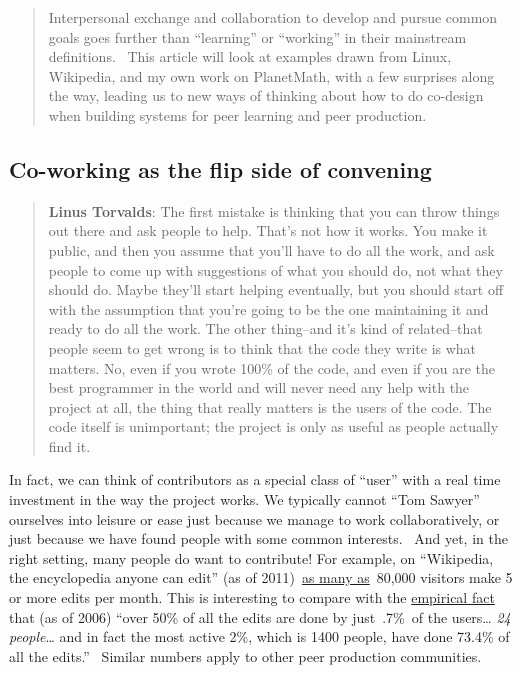 \begin{quote}
Interpersonal exchange and collaboration to develop and pursue common
goals goes further than ``learning'' or ``working'' in their mainstream
definitions. ~This article will look at examples drawn from Linux,
Wikipedia, and my own work on PlanetMath, with a few surprises along the
way, leading us to new ways of thinking about how to do co-design when
building systems for peer learning and peer production.
\end{quote}

\hypertarget{co-working-as-the-flip-side-of-convening}{%
\subsection{Co-working as the flip side of
convening}\label{co-working-as-the-flip-side-of-convening}}

\begin{quote}
\textbf{Linus Torvalds}: The first mistake is thinking that you can
throw things out there and ask people to help. That's not how it works.
You make it public, and then you assume that you'll have to do all the
work, and ask people to come up with suggestions of what you should do,
not what they should do. Maybe they'll start helping eventually, but you
should start off with the assumption that you're going to be the one
maintaining it and ready to do all the work. The other thing--and it's
kind of related--that people seem to get wrong is to think that the code
they write is what matters. No, even if you wrote 100\% of the code, and
even if you are the best programmer in the world and will never need any
help with the project at all, the thing that really matters is the users
of the code. The code itself is unimportant; the project is only as
useful as people actually find it.
\end{quote}

In fact, we can think of contributors as a special class of ``user''
with a real time investment in the way the project works. We typically
cannot ``Tom Sawyer'' ourselves into leisure or ease just because we
manage to work collaboratively, or just because we have found people
with some common interests.~ And yet, in the right setting, many people
do want to contribute! For example, on ``Wikipedia, the encyclopedia
anyone can edit'' (as of
2011)~\href{http://\%20http://www.readwriteweb.com/archives/wikipedias_goal_1_billion_monthly_visitors_by_2015.php}{as
many as}~80,000 visitors make 5 or more edits per month. This is
interesting to compare with the
\href{http://www.aaronsw.com/weblog/whowriteswikipedia}{empirical fact}
that (as of 2006) ``over 50\% of all the edits are done by just~.7\%~of
the users\ldots{} \emph{24 people}\ldots{} and in fact the most active
2\%, which is 1400 people, have done 73.4\% of all the edits.''~ Similar
numbers apply to other peer production communities.

